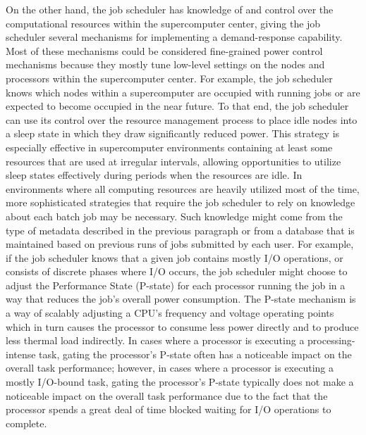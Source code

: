On the other hand, the job scheduler has knowledge of and control over
the computational resources within the supercomputer center, giving
the job scheduler several mechanisms for implementing a
demand-response capability.  Most of these mechanisms could be
considered fine-grained power control mechanisms because they mostly
tune low-level settings on the nodes and processors within the
supercomputer center.  For example, the job scheduler knows which
nodes within a supercomputer are occupied with running jobs or are
expected to become occupied in the near future.  To that end, the job
scheduler can use its control over the resource management process to
place idle nodes into a sleep state in which they draw significantly
reduced power.  This strategy is especially effective in supercomputer
environments containing at least some resources that are used at
irregular intervals, allowing opportunities to utilize sleep states
effectively during periods when the resources are idle.  In
environments where all computing resources are heavily utilized most
of the time, more sophisticated strategies that require the job
scheduler to rely on knowledge about each batch job may be necessary.
Such knowledge might come from the type of metadata described in the
previous paragraph or from a database that is maintained based on
previous runs of jobs submitted by each user.  For example, if the job
scheduler knows that a given job contains mostly I/O operations, or
consists of discrete phases where I/O occurs, the job scheduler might
choose to adjust the Performance State (P-state) for each processor
running the job in a way that reduces the job's overall power
consumption.  The P-state mechanism is a way of scalably adjusting a
CPU's frequency and voltage operating points which in turn causes the
processor to consume less power directly and to produce less thermal
load indirectly.  In cases where a processor is executing a
processing-intense task, gating the processor's P-state often has a
noticeable impact on the overall task performance; however, in cases
where a processor is executing a mostly I/O-bound task, gating the
processor's P-state typically does not make a noticeable impact on the
overall task performance due to the fact that the processor spends a
great deal of time blocked waiting for I/O operations to complete.

